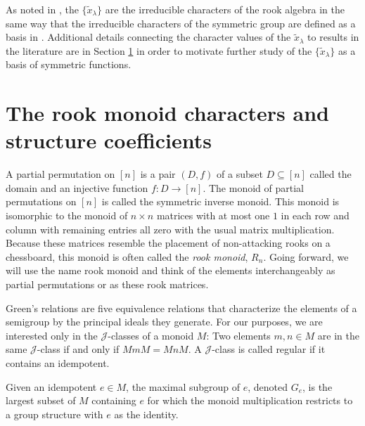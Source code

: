 \documentclass{amsart}
\theoremstyle{definition}
\newcommand{\htil}{\tilde{h}}
\newcommand{\xt}{\tilde x}
\begin{document}
As noted in \cite[Remark 1]{OZ_hopf}, the $\{ \xt_\lambda \}$ are the
irreducible characters of the
rook algebra in the same way that the irreducible characters of the symmetric group
are defined as a basis in \cite{OZ_character}.
Additional details connecting the character values of the $\xt_\lambda$ to results
in the literature are in Section \ref{sec:rook monoid}
in order to motivate further study of the $\{ \xt_\lambda \}$ as
a basis of symmetric functions.


\section{The rook monoid characters and structure coefficients}
    \label{sec:rook monoid}

A partial permutation on $[n]$ is a pair $(D,f)$
of a subset $D\subseteq[n]$ called the domain and
an injective function $f:D\to [n]$.
The monoid of partial permutations on $[n]$
is called the symmetric inverse monoid.
This monoid is isomorphic to the monoid of $n\times n$ matrices
with at most one $1$ in each row and column with remaining entries all
zero with the usual matrix multiplication.
Because these matrices resemble the placement of non-attacking
rooks on a chessboard, this monoid is often called the {\it rook monoid}, $R_n$.
Going forward, we will use the name rook monoid and think of the elements
interchangeably as partial permutations or as these rook matrices.


Green's relations are five equivalence relations that characterize the elements of a semigroup by
the principal ideals they generate. For our purposes, we are interested only in the $\mathcal{J}$-classes
of a monoid $M$:
Two elements $m,n\in M$ are in the same $\mathcal{J}$-class if and only if $MmM=MnM$.
A $\mathcal{J}$-class is called regular if it contains an idempotent. 


Given an idempotent $e\in M$, the maximal subgroup of $e$, denoted $G_e$,
is the largest subset of $M$ containing $e$ for which the monoid multiplication
restricts to a group structure with $e$ as the identity.
\end{document}
